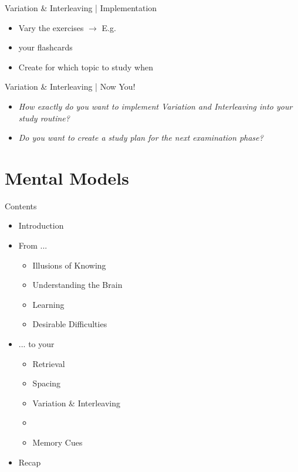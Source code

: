 \documentclass{ercisbeamer}
\begin{document}
\begin{frame}{Variation \& Interleaving | Implementation}
    \begin{itemize}
        \item Vary the exercises $\rightarrow$ E.g. 
        \item {} your flashcards
        \item Create  for which topic to study when 
    \end{itemize}
\end{frame}

\begin{frame}{Variation \& Interleaving | Now You!}
    \begin{itemize}
        \item \emph{How exactly do you want to implement Variation and Interleaving into your study routine?}
        \item \emph{Do you want to create a study plan for the next examination phase?}
    \end{itemize}
\end{frame}

\section{Mental Models}
\begin{frame}{Contents}
    \begin{itemize}
        \item Introduction
        \item From ...
        \begin{itemize}
            \item Illusions of Knowing
            \item Understanding the Brain
            \item Learning
            \item Desirable Difficulties
        \end{itemize}
        \item ... to your 
        \begin{itemize}
            \item Retrieval
            \item Spacing
            \item Variation \& Interleaving
            \item {}
            \item Memory Cues
        \end{itemize}
        \item Recap
    \end{itemize}
\end{frame}
\end{document}
